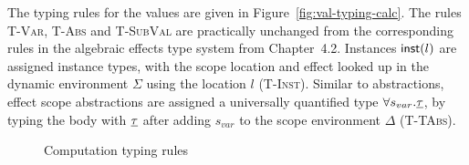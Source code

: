 {The typing rules for the values are given in Figure~\ref{fig:val-typing-calc}.
The rules \textsc{T-Var}, \textsc{T-Abs} and \textsc{T-SubVal} are practically unchanged from the corresponding rules in the algebraic effects type system from Chapter~4.2.
Instances $\mathsf{inst}(l)$ are assigned instance types, with the scope location and effect looked up in the dynamic environment $\Sigma$ using the location $l$ (\textsc{T-Inst}).
Similar to abstractions, effect scope abstractions are assigned a universally quantified type $\forall s_{var} . \underline{\tau}$, by typing the body with $\underline{\tau}$ after adding $s_{var}$ to the scope environment $\Delta$ (\textsc{T-TAbs}).

\begin{figure}[H]
\caption{Computation typing rules}
\centering
{}
\end{figure}}
